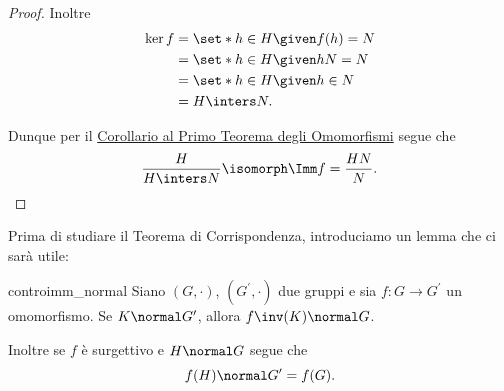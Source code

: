 \begin{proof}
    Inoltre \begin{align*}
        \ker f &= \set*{h \in H \given f(h) = N} \\
        &= \set*{h \in H \given hN = N} \\
        &= \set*{h \in H \given h \in N} \\
        &= H \inters N.
    \end{align*}

    Dunque per il \hyperref[cor:G/ker=Imm]{Corollario al Primo Teorema degli Omomorfismi} segue che \[
        \frac{H}{H \inters N} \isomorph \Imm f = \frac{HN}{N}. \qedhere    
    \]
\end{proof}

Prima di studiare il Teorema di Corrispondenza, introduciamo un lemma che ci sarà utile:
\begin{lemma}{controimm_normal}
    Siano $(G, \cdot)$, $(G^\prime, \cdot)$ due gruppi e sia $f : G \to G^\prime$ un omomorfismo. Se $K \normal G^\prime$, allora $f\inv(K) \normal G$.

    Inoltre se $f$ è surgettivo e $H \normal G$ segue che \[
        f(H) \normal G^\prime = f(G).    
    \]
\end{lemma}

